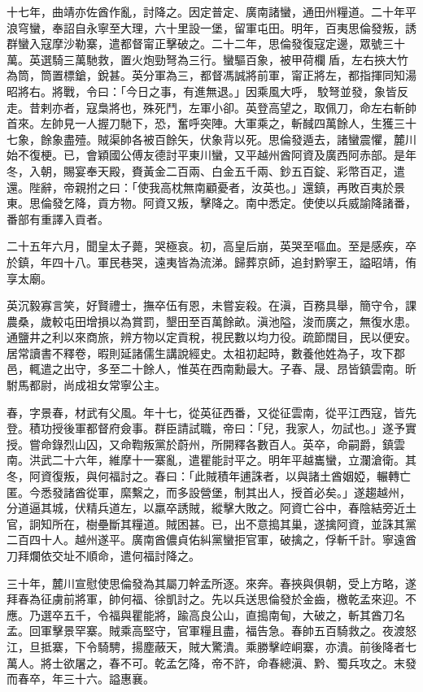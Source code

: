 \begin{pinyinscope}
十七年，曲靖亦佐酋作亂，討降之。因定普定、廣南諸蠻，通田州糧道。二十年平浪穹蠻，奉詔自永寧至大理，六十里設一堡，留軍屯田。明年，百夷思倫發叛，誘群蠻入寇摩沙勒寨，遣都督甯正擊破之。二十二年，思倫發復寇定邊，眾號三十萬。英選騎三萬馳救，置火炮勁弩為三行。蠻驅百象，被甲荷欄盾，左右挾大竹為筒，筒置標鎗，銳甚。英分軍為三，都督馮誠將前軍，甯正將左，都指揮同知湯昭將右。將戰，令曰：「今日之事，有進無退。」因乘風大呼，駮弩並發，象皆反走。昔剌亦者，寇梟將也，殊死鬥，左軍小卻。英登高望之，取佩刀，命左右斬帥首來。左帥見一人握刀馳下，恐，奮呼突陣。大軍乘之，斬馘四萬餘人，生獲三十七象，餘象盡殪。賊渠帥各被百餘矢，伏象背以死。思倫發遁去，諸蠻震懼，麓川始不復梗。已，會穎國公傅友德討平東川蠻，又平越州酋阿資及廣西阿赤部。是年冬，入朝，賜宴奉天殿，賚黃金二百兩、白金五千兩、鈔五百錠、彩幣百疋，遣還。陛辭，帝親拊之曰：「使我高枕無南顧憂者，汝英也。」還鎮，再敗百夷於景東。思倫發乞降，貢方物。阿資又叛，擊降之。南中悉定。使使以兵威諭降諸番，番部有重譯入貢者。

二十五年六月，聞皇太子薨，哭極哀。初，高皇后崩，英哭至嘔血。至是感疾，卒於鎮，年四十八。軍民巷哭，遠夷皆為流涕。歸葬京師，追封黔寧王，謚昭靖，侑享太廟。

英沉毅寡言笑，好賢禮士，撫卒伍有恩，未嘗妄殺。在滇，百務具舉，簡守令，課農桑，歲較屯田增損以為賞罰，墾田至百萬餘畝。滇池隘，浚而廣之，無復水患。通鹽井之利以來商旅，辨方物以定貢稅，視民數以均力役。疏節闊目，民以便安。居常讀書不釋卷，暇則延諸儒生講說經史。太祖初起時，數養他姓為子，攻下郡邑，輒遣之出守，多至二十餘人，惟英在西南勳最大。子春、晟、昂皆鎮雲南。昕駙馬都尉，尚成祖女常寧公主。

春，字景春，材武有父風。年十七，從英征西番，又從征雲南，從平江西寇，皆先登。積功授後軍都督府僉事。群臣請試職，帝曰：「兒，我家人，勿試也。」遂予實授。嘗命錄烈山囚，又命鞫叛黨於蔚州，所開釋各數百人。英卒，命嗣爵，鎮雲南。洪武二十六年，維摩十一寨亂，遣瞿能討平之。明年平越巂蠻，立瀾滄衛。其冬，阿資復叛，與何福討之。春曰：「此賊積年逋誅者，以與諸土酋姻婭，輾轉亡匿。今悉發諸酋從軍，縻繫之，而多設營堡，制其出人，授首必矣。」遂趨越州，分道逼其城，伏精兵道左，以羸卒誘賊，縱擊大敗之。阿資亡谷中，春陰結旁近土官，詗知所在，樹壘斷其糧道。賊困甚。已，出不意搗其巢，遂擒阿資，並誅其黨二百四十人。越州遂平。廣南酋儂貞佑糾黨蠻拒官軍，破擒之，俘斬千計。寧遠酋刀拜爛依交址不順命，遣何福討降之。

三十年，麓川宣慰使思倫發為其屬刀幹孟所逐。來奔。春挾與俱朝，受上方略，遂拜春為征虜前將軍，帥何福、徐凱討之。先以兵送思倫發於金齒，檄乾孟來迎。不應。乃選卒五千，令福與瞿能將，踰高良公山，直搗南甸，大破之，斬其酋刀名孟。回軍擊景罕寨。賊乘高堅守，官軍糧且盡，福告急。春帥五百騎救之。夜渡怒江，旦抵寨，下令騎騁，揚塵蔽天，賊大驚潰。乘勝擊崆峒寨，亦潰。前後降者七萬人。將士欲屠之，春不可。乾孟乞降，帝不許，命春總滇、黔、蜀兵攻之。末發而春卒，年三十六。謚惠襄。


\end{pinyinscope}
